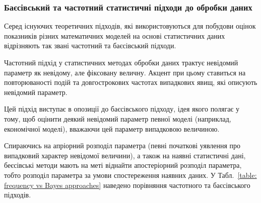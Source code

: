 \subsubsection{Баєсівський та частотний статистичні підходи до обробки даних}

Серед існуючих теоретичних підходів, які використовуються для побудови оцінок показників різних математичних моделей на основі статистичних даних відрізняють так звані частотний та баєсівський підходи. 

Частотний підхід у статистичних методах обробки даних трактує невідомий параметр як невідому, але фіксовану величну. Акцент при цьому ставиться на повторюваності подій та довгострокових частотах випадкових явищ, які описують невідомий параметр.

Цей підхід виступає в опозиції до баєсівського підходу, ідея якого полягає у тому, щоб оцінити деякий невідомий параметр певної моделі (наприклад, економічної моделі), вважаючи цей параметр випадковою величиною. 

Спираючись на апріорний розподіл параметра (певні початкові уявлення про випадковий характер невідомої величини), а також на наявні статистичні дані, беєсівські методи мають на меті віднайти апостеріорний розподіл параметра, тобто розподіл параметра за умови спостереження наявних даних. У Табл.~\ref{table: frequency vs Bayes approaches} наведено порівняння частотного та баєсівського підходів.

